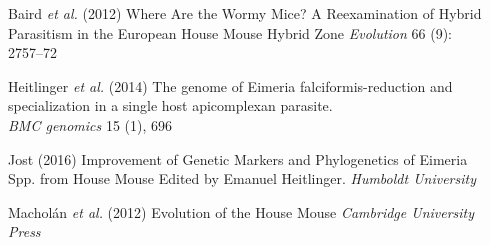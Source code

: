 \documentclass[30pt, a0paper, portrait, margin=0mm, innermargin=15mm,
               blockverticalspace=15mm, colspace=15mm, subcolspace=8mm]{tikzposter}
\begin{document}
\begin{columns}
{\begin{center}
  \end{center}
}


      {
        \begin{small}
          
          \hangindent=2cm Baird \textit{et al.} (2012) Where Are the Wormy Mice? A Reexamination of Hybrid Parasitism in the European House Mouse Hybrid Zone
           \textit{Evolution} 66 (9): 2757--72
           
          \hangindent=2cm Heitlinger \textit{et al.} (2014) The genome of Eimeria falciformis-reduction and specialization in a single host apicomplexan              parasite.\\ \textit{BMC genomics} 15 (1), 696

          \hangindent=2cm Jost (2016) Improvement of Genetic Markers and Phylogenetics of Eimeria Spp. from House Mouse
          Edited by Emanuel Heitlinger. \textit{Humboldt University}

          \hangindent=2cm Machol\'{a}n \textit{et al.} (2012) Evolution of the House Mouse
          \textit{Cambridge University Press}
          
        
          
        \end{small}
      }

\end{columns}

\end{document}
